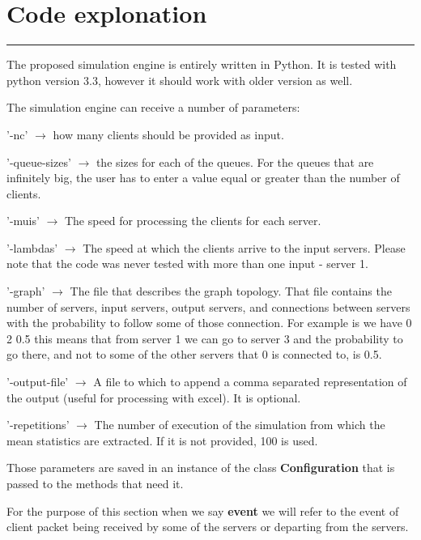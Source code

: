 \documentclass[12pt]{article}
\newcommand{\hr}{\rule{\linewidth}{0.1mm}}
\newenvironment{itemize*}{
  \begin{itemize}
    \setlength{\itemsep}{0pt}
    \setlength{\parskip}{0pt}
    \setlength{\parsep}{0pt}
}{
  \end{itemize}
}
\theoremstyle{plain}
\begin{document}
\section*{\centering
  Code explonation
}

\hr

The proposed simulation engine is entirely written in Python. It is tested with
python version 3.3, however it should work with older version as well.

The simulation engine can receive a number of parameters: 
\begin{itemize*}
  \item '-nc' $\rightarrow$ how many clients should be provided as input.
  \item '-queue-sizes' $\rightarrow$ the sizes for each of the queues. For the
    queues that are infinitely big, the user has to enter a value equal or 
    greater than the number of clients.
  \item '-muis' $\rightarrow$ The speed for processing the clients for each 
    server.
  \item '-lambdas' $ \rightarrow $ The speed at which the clients arrive to the
    input servers. Please note that the code was never tested with more than
    one input - server 1.
  \item '-graph' $ \rightarrow $ The file that describes the graph topology.
    That file contains the number of servers, input servers, output servers,
    and connections between servers with the probability to follow some of 
    those connection. For example is we have 0 2 0.5 this means that from 
    server 1 we can go to server 3 and the probability to go there, and not to
    some of the other servers that 0 is connected to, is 0.5.
  \item '-output-file' $ \rightarrow $ A file to which to append a comma
    separated representation of the output (useful for processing with excel).
    It is optional.
  \item '-repetitions' $ \rightarrow $ The number of execution of the simulation
    from which the mean statistics are extracted. If it is not provided, 100 is
    used.
\end{itemize*}

Those parameters are saved in an instance of the class \textbf{Configuration}
that is passed to the methods that need it.

For the purpose of this section when we say \textbf{event} we will refer to the
event of client packet being received by some of the servers or departing from
the servers.
\end{document}
